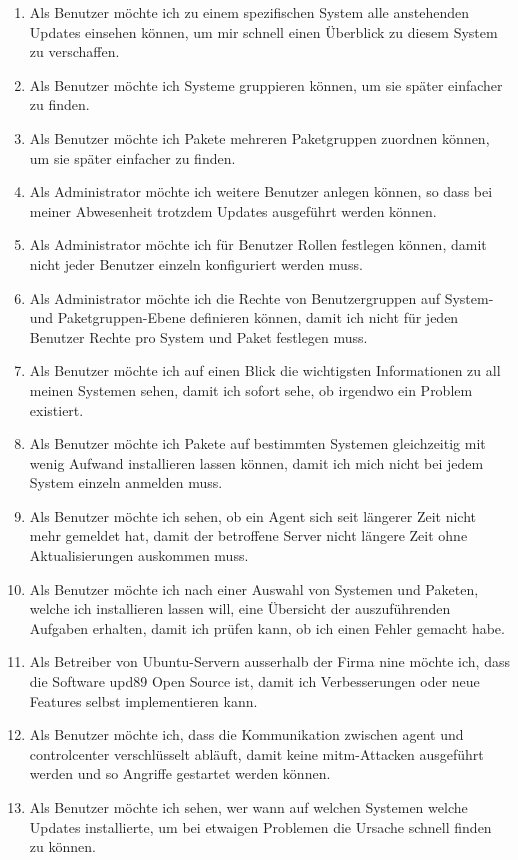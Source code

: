 \begin{enumerate}
    \item Als Benutzer möchte ich zu einem spezifischen System alle anstehenden Updates einsehen können, um mir schnell einen Überblick zu diesem System zu verschaffen.
    \item Als Benutzer möchte ich Systeme gruppieren können, um sie später einfacher zu finden.
    \item Als Benutzer möchte ich Pakete mehreren Paketgruppen zuordnen können, um sie später einfacher zu finden.
    \item Als Administrator möchte ich weitere Benutzer anlegen können, so dass bei meiner Abwesenheit trotzdem Updates ausgeführt werden können.
    \item Als Administrator möchte ich für Benutzer Rollen festlegen können, damit nicht jeder Benutzer einzeln konfiguriert werden muss.
    \item Als Administrator möchte ich die Rechte von Benutzergruppen auf System- und Paketgruppen-Ebene definieren können, damit ich nicht für jeden Benutzer Rechte pro System und Paket festlegen muss.
    \item Als Benutzer möchte ich auf einen Blick die wichtigsten Informationen zu all meinen Systemen sehen, damit ich sofort sehe, ob irgendwo ein Problem existiert.
    \item Als Benutzer möchte ich Pakete auf bestimmten Systemen gleichzeitig mit wenig Aufwand installieren lassen können, damit ich mich nicht bei jedem System einzeln anmelden muss.
    \item Als Benutzer möchte ich sehen, ob ein Agent sich seit längerer Zeit nicht mehr gemeldet hat, damit der betroffene Server nicht längere Zeit ohne Aktualisierungen auskommen muss.
    \item Als Benutzer möchte ich nach einer Auswahl von Systemen und Paketen, welche ich installieren lassen will, eine Übersicht der auszuführenden Aufgaben erhalten, damit ich prüfen kann, ob ich einen Fehler gemacht habe.
    \item Als Betreiber von Ubuntu-Servern ausserhalb der Firma \gls{nine} möchte ich, dass die Software \gls{upd89} Open Source ist, damit ich Verbesserungen oder neue Features selbst implementieren kann.
    \item Als Benutzer möchte ich, dass die Kommunikation zwischen \gls{agent} und \gls{controlcenter} verschlüsselt abläuft, damit keine \gls{mitm}-Attacken ausgeführt werden und so Angriffe gestartet werden können.
    \item Als Benutzer möchte ich sehen, wer wann auf welchen Systemen welche Updates installierte, um bei etwaigen Problemen die Ursache schnell finden zu können.

\end{enumerate}
